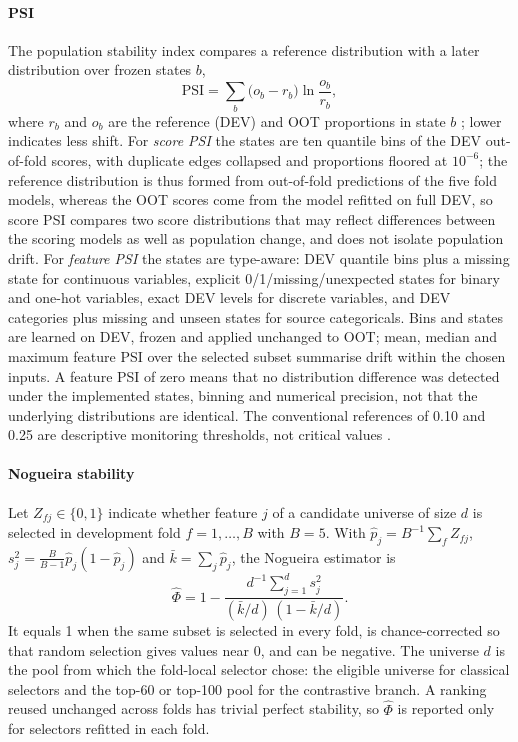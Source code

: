 \documentclass[final,5p,twocolumn]{elsarticle}
\newcommand{\PSI}{\mathrm{PSI}}
\begin{document}
\paragraph{PSI}
The population stability index compares a reference distribution with a later distribution over frozen states $b$,
\begin{equation}
    \PSI=\sum_{b}\big(o_b-r_b\big)\ln\frac{o_b}{r_b},
    \label{eq:psi}
\end{equation}
where $r_b$ and $o_b$ are the reference (DEV) and OOT proportions in state $b$ \cite{siddiqi2006,yurdakul2020}; lower indicates less shift. For \emph{score PSI} the states are ten quantile bins of the DEV out-of-fold scores, with duplicate edges collapsed and proportions floored at $10^{-6}$; the reference distribution is thus formed from out-of-fold predictions of the five fold models, whereas the OOT scores come from the model refitted on full DEV, so score PSI compares two score distributions that may reflect differences between the scoring models as well as population change, and does not isolate population drift. For \emph{feature PSI} the states are type-aware: DEV quantile bins plus a missing state for continuous variables, explicit 0/1/missing/unexpected states for binary and one-hot variables, exact DEV levels for discrete variables, and DEV categories plus missing and unseen states for source categoricals. Bins and states are learned on DEV, frozen and applied unchanged to OOT; mean, median and maximum feature PSI over the selected subset summarise drift within the chosen inputs. A feature PSI of zero means that no distribution difference was detected under the implemented states, binning and numerical precision, not that the underlying distributions are identical. The conventional references of 0.10 and 0.25 are descriptive monitoring thresholds, not critical values \cite{yurdakul2020}.

\paragraph{Nogueira stability}
Let $Z_{fj}\in\{0,1\}$ indicate whether feature $j$ of a candidate universe of size $d$ is selected in development fold $f=1,\dots,B$ with $B=5$. With $\hat p_j=B^{-1}\sum_f Z_{fj}$, $s_j^2=\frac{B}{B-1}\hat p_j(1-\hat p_j)$ and $\bar k=\sum_j \hat p_j$, the Nogueira estimator is \cite{nogueira2018}
\begin{equation}
    \hat\Phi=1-\frac{d^{-1}\sum_{j=1}^{d}s_j^2}{(\bar k/d)\,(1-\bar k/d)} .
    \label{eq:nogueira}
\end{equation}
It equals 1 when the same subset is selected in every fold, is chance-corrected so that random selection gives values near 0, and can be negative. The universe $d$ is the pool from which the fold-local selector chose: the eligible universe for classical selectors and the top-60 or top-100 pool for the contrastive branch. A ranking reused unchanged across folds has trivial perfect stability, so $\hat\Phi$ is reported only for selectors refitted in each fold.
\end{document}
